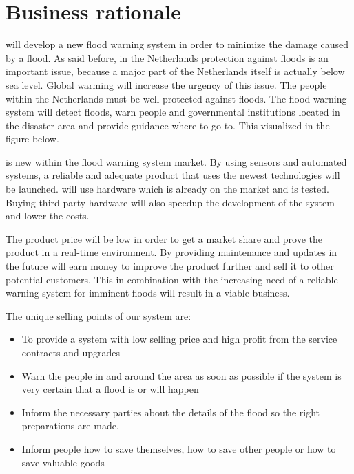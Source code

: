 %

\section{Business rationale}
\CompanyName{} will develop a new flood warning system in order to minimize the damage caused by a flood. As said before, in the Netherlands protection against floods is an important issue, because a major part of the Netherlands itself is actually below sea level. Global warming will increase the urgency of this issue. The people within the Netherlands must be well protected against floods. The flood warning system will detect floods, warn people and governmental institutions located in the disaster area and provide guidance where to go to. This visualized in the figure below.

\CompanyName{} is new within the flood warning system market. By using sensors and automated systems, a reliable and adequate product that uses the newest technologies will be launched. \CompanyName{} will use hardware which is already on the market and is tested. Buying third party hardware will also speedup the development of the system and lower the costs.

The product price will be low in order to get a market share and prove the product in a real-time environment. By providing maintenance and updates in the future \CompanyName{} will earn money to improve the product further and sell it to other potential customers. This in combination with the increasing need of a reliable warning system for imminent floods will result in a viable business.


The unique selling points of our system are: 
\begin{itemize}
	\item To provide a system with low selling price and high profit from the service contracts and upgrades
	\item Warn the people in and around the area as soon as possible if the system is very certain that a flood is or will happen
	\item Inform the necessary parties about the details of the flood so the right preparations are made. 
	\item Inform people how to save themselves, how to save other people or how to save valuable goods
\end{itemize}

